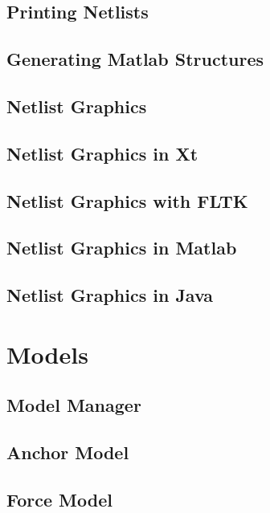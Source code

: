 \documentclass[10pt]{report}
\begin{document}
\chapter{Printing Netlists}


\chapter{Generating Matlab Structures}


\chapter{Netlist Graphics}


\chapter{Netlist Graphics in Xt}


\chapter{Netlist Graphics with FLTK}


\chapter{Netlist Graphics in Matlab}


\chapter{Netlist Graphics in Java}



\part{Models}

\chapter{Model Manager}


\chapter{Anchor Model}


\chapter{Force Model}

\end{document}
